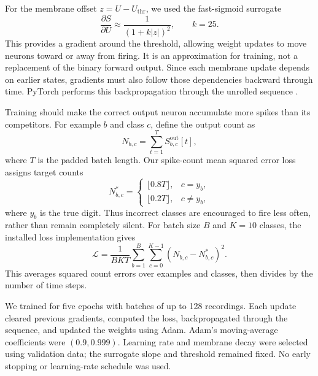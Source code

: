 For the membrane offset $z=U-U_{\mathrm{thr}}$, we used the fast-sigmoid surrogate
\begin{equation}
    \frac{\partial S}{\partial U}
    \approx \frac{1}{(1+k|z|)^2},
    \qquad k=25.
    \label{eq:surrogate}
\end{equation}
This provides a gradient around the threshold, allowing weight updates to move neurons toward or away from firing. It is an approximation for training, not a replacement of the binary forward output. Since each membrane update depends on earlier states, gradients must also follow those dependencies backward through time. PyTorch performs this backpropagation through the unrolled sequence \citep{snntorchTutorial5}.

Training should make the correct output neuron accumulate more spikes than its competitors. For example $b$ and class $c$, define the output count as
\begin{equation}
    N_{b,c} = \sum_{t=1}^{T} S^{\mathrm{out}}_{b,c}[t],
    \label{eq:output-count}
\end{equation}
where $T$ is the padded batch length. Our spike-count mean squared error loss assigns target counts
\begin{equation}
    N^{*}_{b,c} =
    \begin{cases}
        \lfloor 0.8T \rfloor, & c=y_b,\\
        \lfloor 0.2T \rfloor, & c\ne y_b,
    \end{cases}
\end{equation}
where $y_b$ is the true digit. Thus incorrect classes are encouraged to fire less often, rather than remain completely silent. For batch size $B$ and $K=10$ classes, the installed loss implementation gives
\begin{equation}
    \mathcal{L} =
    \frac{1}{BKT}
    \sum_{b=1}^{B}\sum_{c=0}^{K-1}
    \left(N_{b,c}-N^{*}_{b,c}\right)^2.
    \label{eq:count-loss}
\end{equation}
This averages squared count errors over examples and classes, then divides by the number of time steps.

We trained for five epochs with batches of up to 128 recordings. Each update cleared previous gradients, computed the loss, backpropagated through the sequence, and updated the weights using Adam. Adam's moving-average coefficients were $(0.9,0.999)$. Learning rate and membrane decay were selected using validation data; the surrogate slope and threshold remained fixed. No early stopping or learning-rate schedule was used.

